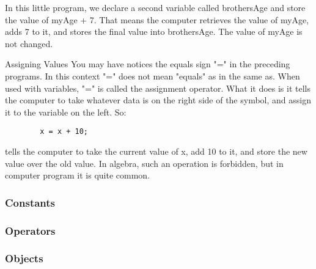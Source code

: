 In this little program, we declare a second variable called brothersAge and store the value of myAge + 7. That means the computer retrieves the value of myAge, adds 7 to it, and stores the final value into brothersAge. The value of myAge is not changed.

	\begin{positiveInformation}{Assigning Values}
	You may have notices the equals sign "=" in the preceding programs. In this context "=" does not mean "equals" as in the same as. When used with variables, "=" is called the assignment operator. What it does is it tells the computer to take whatever data is on the right side of the symbol, and assign it to the variable on the left. So:
		\begin{verbatim}
		x = x + 10;
		\end{verbatim}
		tells the computer to take the current value of x, add 10 to it, and store the new value over the old value. In algebra, such an operation is forbidden, but in computer program it is quite common.
	\end{positiveInformation}	
\subsubsection*{Constants}
\subsubsection*{Operators}
\subsubsection*{Objects}

